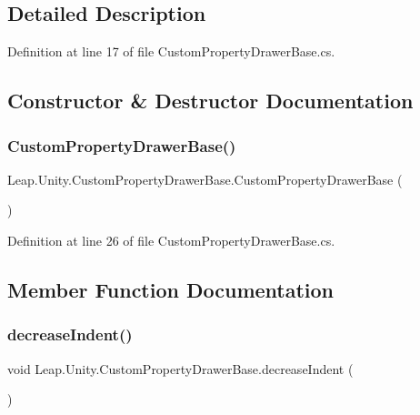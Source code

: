 \subsection{Detailed Description}


Definition at line 17 of file Custom\+Property\+Drawer\+Base.\+cs.



\subsection{Constructor \& Destructor Documentation}
\mbox{\label{class_leap_1_1_unity_1_1_custom_property_drawer_base_a1ea66e1186afcd296e95407337093f7d}} 
\subsubsection{\texorpdfstring{CustomPropertyDrawerBase()}{CustomPropertyDrawerBase()}}
{\footnotesize\ttfamily Leap.\+Unity.\+Custom\+Property\+Drawer\+Base.\+Custom\+Property\+Drawer\+Base (\begin{DoxyParamCaption}{ }\end{DoxyParamCaption})}



Definition at line 26 of file Custom\+Property\+Drawer\+Base.\+cs.



\subsection{Member Function Documentation}
\mbox{\label{class_leap_1_1_unity_1_1_custom_property_drawer_base_aa29f79e7f8dc83ff5625aee15a60087b}} 
\subsubsection{\texorpdfstring{decreaseIndent()}{decreaseIndent()}}
{\footnotesize\ttfamily void Leap.\+Unity.\+Custom\+Property\+Drawer\+Base.\+decrease\+Indent (\begin{DoxyParamCaption}{ }\end{DoxyParamCaption})\hspace{0.3cm}{\ttfamily [protected]}}



